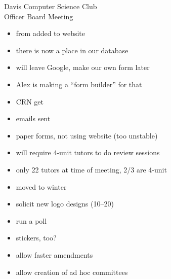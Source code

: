 \documentclass{article}
\begin{document}
\begin{Minutes}{Davis Computer Science Club\\Officer Board Meeting}
\missingNoExcuse{}




\maketitle
{}
\begin{itemize}
\item from added to website
\item there is now a place in our database
\item will leave Google, make our own form later
\item Alex is making a ``form builder'' for that
\end{itemize}

\begin{itemize}
\item CRN get
\item emails sent
\item paper forms, not using website (too unstable)
\item will require 4-unit tutors to do review sessions
\item only 22 tutors at time of meeting, 2/3 are 4-unit
\end{itemize}

\begin{itemize}
\item moved to winter
\end{itemize}

\begin{itemize}
\item solicit new logo designs (10--20)
\item run a poll
\item stickers, too?
\end{itemize}

\begin{itemize}
\item allow faster amendments
\item allow creation of ad hoc committees
\end{itemize}


\end{Minutes}
\end{document}
